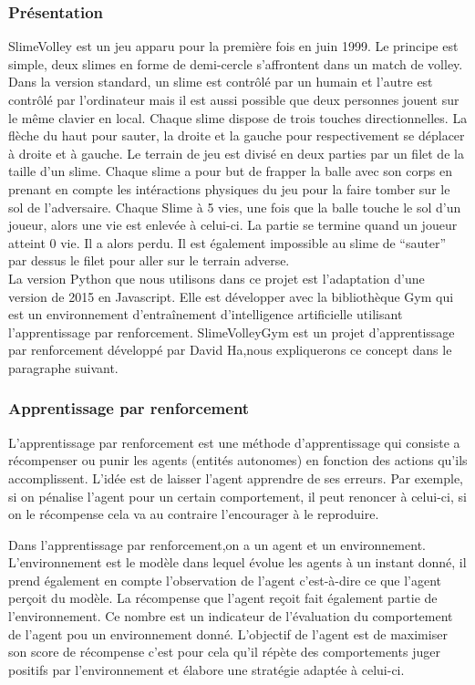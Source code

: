 \documentclass[11pt, a4paper]{article}
\begin{document}
\subsubsection{Présentation}
SlimeVolley est un jeu apparu pour la première fois en juin 1999. Le principe est simple, deux slimes en forme de demi-cercle s'affrontent dans un  match de volley. Dans la version standard, un slime est contrôlé par un humain et l’autre est contrôlé par l’ordinateur mais il est aussi possible que deux personnes jouent sur le même clavier en local. Chaque slime dispose de trois touches directionnelles. La flèche du haut pour sauter, la droite et la gauche pour respectivement se déplacer à droite et à gauche. Le terrain de jeu est divisé en deux parties par un filet de la taille d’un slime. Chaque slime a pour but de frapper la balle avec son corps en prenant en compte les intéractions physiques du jeu pour la faire tomber sur le sol de l’adversaire. Chaque Slime à 5 vies, une fois que la balle touche le sol d’un joueur, alors une vie est enlevée à celui-ci. La partie se termine quand un joueur atteint 0 vie. Il a alors perdu. Il est également impossible au slime de “sauter” par dessus le filet pour aller sur le terrain adverse.  \\
La version Python que nous utilisons dans ce projet est l’adaptation d’une version de 2015 en Javascript. Elle est développer avec la bibliothèque Gym qui est un environnement d'entraînement d'intelligence artificielle utilisant l’apprentissage par renforcement. SlimeVolleyGym est un projet d'apprentissage par renforcement développé par David Ha\cite{slimevolleygym},nous expliquerons ce concept dans le paragraphe suivant.

\subsubsection{Apprentissage par renforcement}
L'apprentissage par renforcement est une méthode d'apprentissage qui consiste a récompenser ou punir les agents (entités autonomes) en fonction des actions qu'ils accomplissent. L'idée est de laisser l'agent apprendre de ses erreurs. Par exemple, si on pénalise l'agent pour  un certain comportement, il peut renoncer à celui-ci, si on le récompense cela va au contraire l'encourager à le reproduire.

Dans l'apprentissage par renforcement,on a un agent et un environnement. L'environnement est le modèle dans lequel évolue les agents à un instant donné, il prend également en compte l'observation de l'agent c'est-à-dire ce que l'agent perçoit du modèle. La récompense que l'agent reçoit fait également partie de l'environnement. Ce nombre est un indicateur de l'évaluation du comportement de l'agent pou un environnement donné. L'objectif de l'agent est de maximiser son score de récompense c'est pour cela qu'il répète des comportements juger positifs par l'environnement et élabore une stratégie adaptée à celui-ci.
\end{document}

